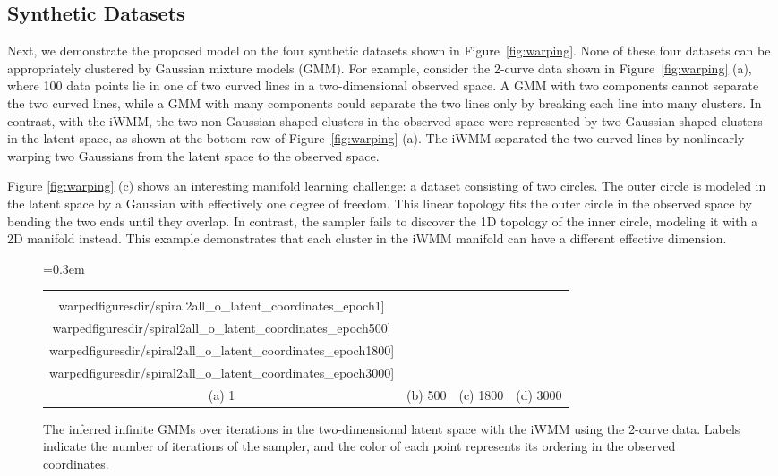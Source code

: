 \subsection{Synthetic Datasets}
Next, we demonstrate the proposed model on the four synthetic datasets shown in Figure~\ref{fig:warping}.
None of these four datasets can be appropriately clustered by Gaussian mixture models (GMM).
For example, consider the 2-curve data shown in Figure~\ref{fig:warping} (a), where 100 data points lie in one of two curved lines in a two-dimensional observed space.
A GMM with two components cannot separate the two curved lines, while a GMM with many components could separate the two lines only by breaking each line into many clusters. 
In contrast, with the iWMM, the two non-Gaussian-shaped clusters in the observed space were represented by two Gaussian-shaped clusters in the latent space, as shown at the bottom row of Figure~\ref{fig:warping} (a).
The iWMM separated the two curved lines by nonlinearly warping two Gaussians from the latent space to the observed space.

Figure \ref{fig:warping} (c) shows an interesting manifold learning challenge: a dataset consisting of two circles.  The outer circle is modeled in the latent space by a Gaussian with effectively one degree of freedom.  This linear topology fits the outer circle in the observed space by bending the two ends until they overlap.  In contrast, the sampler fails to discover the 1D topology of the inner circle, modeling it with a 2D manifold instead.  This example demonstrates that each cluster in the iWMM manifold can have a different effective dimension.

\begin{figure*}[t!]
\centering
{\tabcolsep=0.3em
\begin{tabular}{cccc}
\fbox{\texttt{[image: \\warpedfiguresdir/spiral2all\_o\_latent\_coordinates\_epoch1]}}&
\fbox{\texttt{[image: \\warpedfiguresdir/spiral2all\_o\_latent\_coordinates\_epoch500]}} & 
\fbox{\texttt{[image: \\warpedfiguresdir/spiral2all\_o\_latent\_coordinates\_epoch1800]}}&
\fbox{\texttt{[image: \\warpedfiguresdir/spiral2all\_o\_latent\_coordinates\_epoch3000]}}\\
(a) 1 & (b) 500 & (c) 1800 & (d) 3000 \\
\end{tabular}}
\caption{The inferred infinite GMMs over iterations in the two-dimensional latent space with the iWMM using the 2-curve data. Labels indicate the number of iterations of the sampler, and the color of each point represents its ordering in the observed coordinates.}
\label{fig:infer}
\end{figure*}


